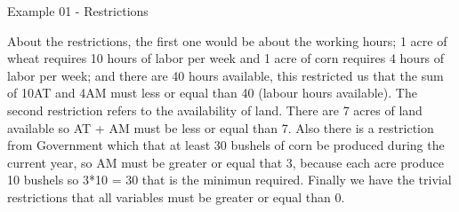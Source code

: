 \begin{frame}{Example 01 - Restrictions}

About the restrictions, the first one would be about the working hours;
1 acre of wheat requires 10 hours of labor per week and 1 acre of corn
requires 4 hours of labor per week; and there are 40 hours available, this
restricted us that the sum of 10AT and 4AM must less or equal than 40
(labour hours available). The second restriction refers to the availability
of land. There are 7 acres of land available so AT + AM must be less or equal
than 7. Also there is a restriction from Government which that at least
30 bushels of corn be produced during the current year, so AM must be
greater or equal that 3, because each acre produce 10 bushels so 3*10 = 30
that is the minimun required. Finally we have the trivial restrictions that all
variables must be greater or equal than 0.

\end{frame}
